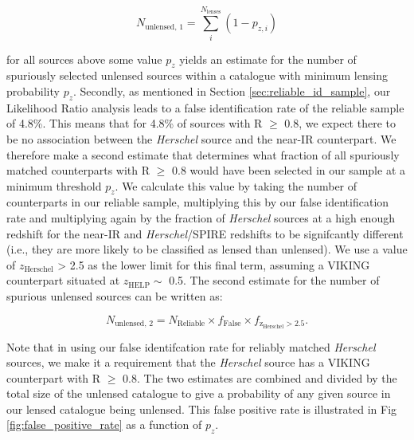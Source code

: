 \documentclass[fleqn,usenatbib]{mnras}
\begin{document}
\begin{equation}
\label{eq:nunlensed_1}
N_{\textrm{unlensed, 1}} = \sum_i^{N_{\textrm{lenses}}} (1 - p_{z,i})
\end{equation}

\noindent for all sources above some value $p_z$ yields an estimate for the number of spuriously selected unlensed sources within a catalogue with minimum lensing probability $p_z$. Secondly, as mentioned in Section \ref{sec:reliable_id_sample}, our Likelihood Ratio analysis leads to a false identification rate of the reliable sample of 4.8\%. This means that for 4.8\% of sources with R $\geq$ 0.8, we expect there to be no association between the \textit{Herschel} source and the near-IR counterpart. We therefore make a second estimate that determines what fraction of all spuriously matched counterparts with R $\geq$ 0.8 would have been selected in our sample at a minimum threshold $p_z$. We calculate this value by taking the number of counterparts in our reliable sample, multiplying this by our false identification rate and multiplying again by the fraction of \textit{Herschel} sources at a high enough redshift for the near-IR and \textit{Herschel}/SPIRE redshifts to be signifcantly different (i.e., they are more likely to be classified as lensed than unlensed). We use a value of $z_{\textrm{Herschel}}$ > 2.5 as the lower limit for this final term, assuming a VIKING counterpart situated at $z_{\textrm{HELP}} \sim$ 0.5. The second estimate for the number of spurious unlensed sources can be written as:

\begin{equation}
\label{eq:nunlensed_2}
N_{\textrm{unlensed, 2}} = N_{\textrm{Reliable}} \times f_{\textrm{False}} \times {f_{\textrm{z}_{\textrm{Herschel}} > 2.5}}.
\end{equation}

Note that in using our false identifcation rate for reliably matched \textit{Herschel} sources, we make it a requirement that the \textit{Herschel} source has a VIKING counterpart with R $\geq$ 0.8. The two estimates are combined and divided by the total size of the unlensed catalogue to give a probability of any given source in our lensed catalogue being unlensed. This false positive rate is illustrated in Fig \ref{fig:false_positive_rate} as a function of $p_z$.
\end{document}
